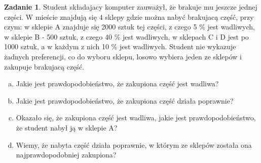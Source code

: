\documentclass[11pt]{article}
\theoremstyle{definition}
\newtheorem{zadanie}{Zadanie}
\numberwithin{zadanie}{section}
\begin{document}
\begin{zadanie}
    Student składajacy komputer zauważył, że brakuje mu jeszcze jednej części. W mieście znajdują się 4 sklepy gdzie można nabyć brakujacą część, przy czym: w sklepie A znajduje się 2000 sztuk tej części, z czego 5 \% jest wadliwych, w sklepie B - 500 sztuk, z czego 40 \% jest wadliwych, w sklepach C i D jest po 1000 sztuk, a w każdym z nich 10 \%
    jest wadliwych. Student nie wykazuje żadnych preferencji, co do wyboru sklepu, losowo wybiera jeden ze sklepów i zakupuje brakujacą część.
    \begin{enumerate}[a)]
        \item Jakie jest prawdopodobieństwo, że zakupiona część jest wadliwa?
        \item Jakie jest prawdopodobieństwo, że zakupiona część działa poprawnie?
        \item Okazało się, że zakupiona część jest wadliwa, jakie jest prawdopodobieństwo, że student nabył ją w sklepie A?
        \item Wiemy, że nabyta część działa poprawnie, w którym ze sklepów została ona najprawdopodobniej zakupiona?
    \end{enumerate}
\end{zadanie}
\end{document}
